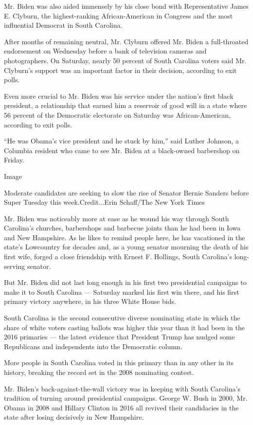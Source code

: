 Mr. Biden was also aided immensely by his close bond with Representative
James E. Clyburn, the highest-ranking African-American in Congress and
the most influential Democrat in South Carolina.

After months of remaining neutral, Mr. Clyburn offered Mr. Biden a
full-throated endorsement on Wednesday before a bank of television
cameras and photographers. On Saturday, nearly 50 percent of South
Carolina voters said Mr. Clyburn's support was an important factor in
their decision, according to exit polls.

Even more crucial to Mr. Biden was his service under the nation's first
black president, a relationship that earned him a reservoir of good will
in a state where 56 percent of the Democratic electorate on Saturday was
African-American, according to exit polls.

``He was Obama's vice president and he stuck by him,'' said Luther
Johnson, a Columbia resident who came to see Mr. Biden at a black-owned
barbershop on Friday.

Image

Moderate candidates are seeking to slow the rise of Senator Bernie
Sanders before Super Tuesday this week.Credit...Erin Schaff/The New York
Times

Mr. Biden was noticeably more at ease as he wound his way through South
Carolina's churches, barbershops and barbecue joints than he had been in
Iowa and New Hampshire. As he likes to remind people here, he has
vacationed in the state's Lowcountry for decades and, as a young senator
mourning the death of his first wife, forged a close friendship with
Ernest F. Hollings, South Carolina's long-serving senator.

But Mr. Biden did not last long enough in his first two presidential
campaigns to make it to South Carolina --- Saturday marked his first win
there, and his first primary victory anywhere, in his three White House
bids.

South Carolina is the second consecutive diverse nominating state in
which the share of white voters casting ballots was higher this year
than it had been in the 2016 primaries --- the latest evidence that
President Trump has nudged some Republicans and independents into the
Democratic column.

More people in South Carolina voted in this primary than in any other in
its history, breaking the record set in the 2008 nominating contest.

Mr. Biden's back-against-the-wall victory was in keeping with South
Carolina's tradition of turning around presidential campaigns. George W.
Bush in 2000, Mr. Obama in 2008 and Hillary Clinton in 2016 all revived
their candidacies in the state after losing decisively in New Hampshire.

